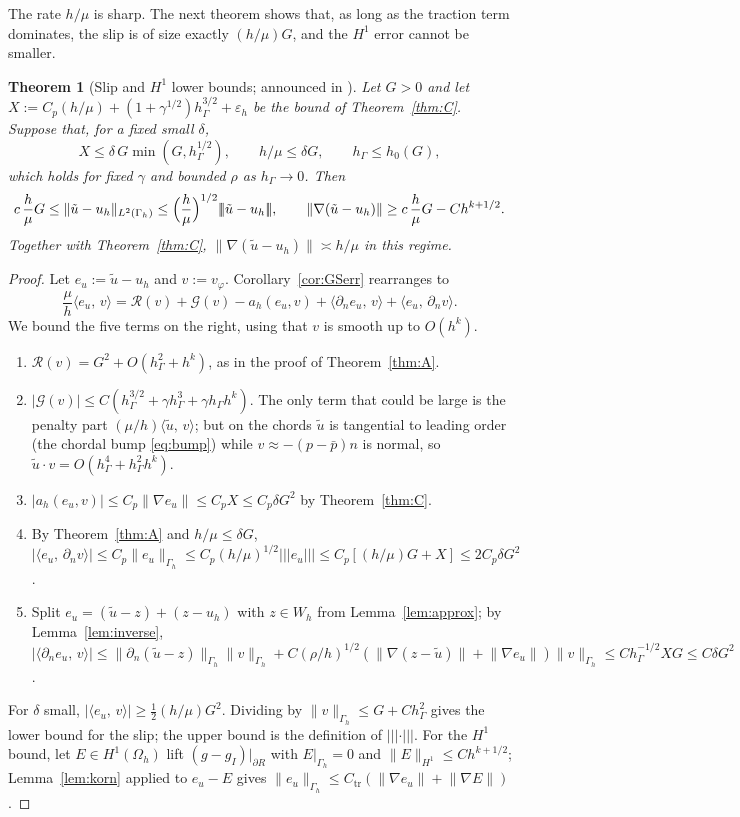 \documentclass[pdflatex,sn-mathphys-num]{sn-jnl}
\theoremstyle{thmstyleone}
\newtheorem{theorem}{Theorem}[section]
\theoremstyle{thmstylethree}
\newcommand{\hG}{h_\Gamma}
\newcommand{\Gh}{\Gamma_h}
\newcommand{\Oh}{\Omega_h}
\newcommand{\Wh}{W_h}
\newcommand{\gI}{g_I}
\newcommand{\dn}{\partial_n}
\newcommand{\ut}{\tilde u}
\newcommand{\pbar}{\bar p}
\newcommand{\ip}[2]{\langle #1,\, #2\rangle}
\newcommand{\tnorm}[1]{|\!|\!|#1|\!|\!|}
\newcommand{\norm}[1]{\lVert #1\rVert}
\newcommand{\eps}{\varepsilon_h}
\newcommand{\Rc}{\mathcal R}
\newcommand{\Gc}{\mathcal G}
\begin{document}
The rate $h/\mu$ is sharp. The next theorem shows that, as long as the traction term dominates, the slip is of size exactly $(h/\mu)G$, and the $H^1$ error cannot be smaller.

\begin{theorem}[Slip and $H^1$ lower bounds; announced in {\cite{CavalcantePadhiLetter}}]\label{thm:B}
Let $G>0$ and let $X:=C_p(h/\mu)+(1+\gamma^{1/2})\hG^{3/2}+\eps$ be the bound of Theorem~\ref{thm:C}. Suppose that, for a fixed small $\delta$,
\[
X\le\delta\,G\min(G,\hG^{1/2}),\qquad h/\mu\le\delta G,\qquad \hG\le h_0(G),
\]
which holds for fixed $\gamma$ and bounded $\rho$ as $\hG\to0$. Then
\[
c\,\frac h\mu G\le\norm{\ut-u_h}_{L^2(\Gh)}\le\Bigl(\frac h\mu\Bigr)^{1/2}\tnorm{\ut-u_h},\qquad
\norm{\nabla(\ut-u_h)}\ge c\,\frac h\mu G-Ch^{k+1/2}.
\]
Together with Theorem~\ref{thm:C}, $\norm{\nabla(\ut-u_h)}\asymp h/\mu$ in this regime.
\end{theorem}

\begin{proof}
Let $e_u:=\ut-u_h$ and $v:=v_\varphi$. Corollary~\ref{cor:GSerr} rearranges to
\[
\frac\mu h\ip{e_u}{v}=\Rc(v)+\Gc(v)-a_h(e_u,v)+\ip{\dn e_u}{v}+\ip{e_u}{\dn v}.
\]
We bound the five terms on the right, using that $v$ is smooth up to $O(h^k)$.
\begin{enumerate}
\item $\Rc(v)=G^2+O(\hG^2+h^k)$, as in the proof of Theorem~\ref{thm:A}.
\item $|\Gc(v)|\le C(\hG^{3/2}+\gamma\hG^3+\gamma\hG h^k)$. The only term that could be large is the penalty part $(\mu/h)\ip{\ut}{v}$; but on the chords $\ut$ is tangential to leading order (the chordal bump \eqref{eq:bump}) while $v\approx-(p-\pbar)n$ is normal, so $\ut\cdot v=O(\hG^4+\hG^2h^k)$.
\item $|a_h(e_u,v)|\le C_p\norm{\nabla e_u}\le C_pX\le C_p\delta G^2$ by Theorem~\ref{thm:C}.
\item By Theorem~\ref{thm:A} and $h/\mu\le\delta G$, $|\ip{e_u}{\dn v}|\le C_p\norm{e_u}_{\Gh}\le C_p(h/\mu)^{1/2}\tnorm{e_u}\le C_p[(h/\mu)G+X]\le2C_p\delta G^2$.
\item Split $e_u=(\ut-z)+(z-u_h)$ with $z\in\Wh$ from Lemma~\ref{lem:approx}; by Lemma~\ref{lem:inverse}, $|\ip{\dn e_u}{v}|\le\norm{\dn(\ut-z)}_{\Gh}\norm{v}_{\Gh}+C(\rho/h)^{1/2}(\norm{\nabla(z-\ut)}+\norm{\nabla e_u})\norm{v}_{\Gh}\le C\hG^{-1/2}XG\le C\delta G^2$.
\end{enumerate}
For $\delta$ small, $|\ip{e_u}{v}|\ge\frac12(h/\mu)G^2$. Dividing by $\norm{v}_{\Gh}\le G+C\hG^2$ gives the lower bound for the slip; the upper bound is the definition of $\tnorm\cdot$. For the $H^1$ bound, let $E\in H^1(\Oh)$ lift $(g-\gI)|_{\partial R}$ with $E|_{\Gh}=0$ and $\norm{E}_{H^1}\le Ch^{k+1/2}$; Lemma~\ref{lem:korn} applied to $e_u-E$ gives $\norm{e_u}_{\Gh}\le C_{\mathrm{tr}}(\norm{\nabla e_u}+\norm{\nabla E})$.
\end{proof}
\end{document}
